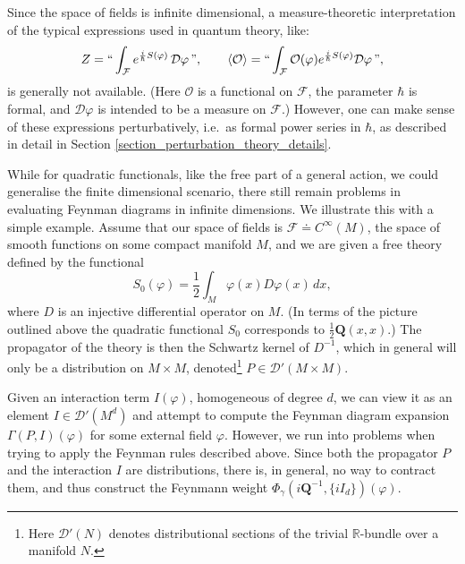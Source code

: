 \documentclass[reqno]{amsart}
\theoremstyle{definition}
\theoremstyle{remark}
\renewcommand{\phi}{\varphi}
\newcommand{\D}{\mathcal{D}'}
\newcommand{\C}{C^\infty}
\newcommand{\F}{\mathcal{F}}
\newcommand{\h}{\hbar}
\begin{document}
Since the space of fields is infinite dimensional, a measure-theoretic interpretation of the typical expressions used in quantum theory, like:
\begin{equation}
\label{partition_function}
    Z = ``\int_\F e^{\frac{i}{\hbar}S(\phi)}\,\mathcal{D}\phi \,", \qquad \langle\mathcal{O}\rangle = `` \int_\F \mathcal{O}(\phi) e^{\frac{i}{\hbar}S(\phi)}\mathcal{D}\phi\," ,
\end{equation}
is generally not available.
(Here $\mathcal{O}$ is a functional on $\F$, the parameter $\h$ is formal, and $\mathcal{D}\phi$ is intended to be a measure on $\F$.) However, one can make sense of these expressions perturbatively, i.e.\ as formal power series in $\hbar$, as described in detail in Section \ref{section_perturbation_theory_details}.

While for quadratic functionals, like the free part of a general action, we could generalise the finite dimensional scenario, there still remain problems in evaluating Feynman diagrams in infinite dimensions. We illustrate this with a simple example. Assume that our space of fields is $\F\doteq\C(M)$, the space of smooth functions on some compact manifold $M$, and we are given a free theory defined by the functional
$$S_0(\phi) = \frac{1}{2}\int_M \phi(x) D \phi(x)\,dx,$$
where $D$ is an injective differential operator on $M$. {(In terms of the picture outlined above the quadratic functional $S_0$ corresponds to $\frac12\mathbf{Q}(x,x)$.)} The propagator of the theory is then the Schwartz kernel of $D^{-1}$, which in general will only be a distribution on $M\times M$, denoted\footnote{Here $\mathcal{D}'(N)$ denotes distributional sections of the trivial $\mathbb{R}$-bundle over a manifold $N$.} $P \in \D(M\times M)$. 

Given an interaction term $I(\phi)$, homogeneous of degree $d$, we can view it as an element $I\in\D(M^d)$ and attempt to compute the Feynman diagram expansion $\Gamma(P,I)(\phi)$ for some external field $\phi$. However, we run into problems when trying to apply the Feynman rules described above. Since both the propagator $P$ and the interaction $I$ are distributions, there is, in general, no way to contract them, and thus construct the Feynmann weight $\Phi_\gamma(i\mathbf{Q}^{-1},\{iI_d\})(\varphi)$. 
\end{document}
